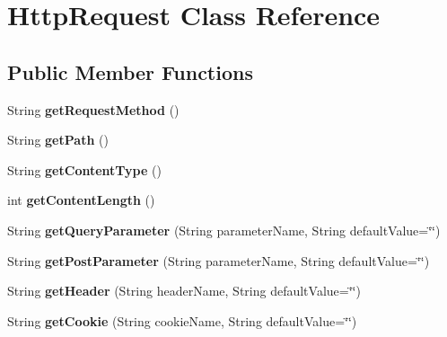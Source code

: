 \hypertarget{class_http_request}{}\section{Http\+Request Class Reference}
\label{class_http_request}
\subsection*{Public Member Functions}
\begin{DoxyCompactItemize}
\item 
\hypertarget{class_http_request_a286a1331701444b0c4ab04858a282c18}{}String {\bfseries get\+Request\+Method} ()\label{class_http_request_a286a1331701444b0c4ab04858a282c18}

\item 
\hypertarget{class_http_request_aac3961439d9ed0645b8acd753b8207ec}{}String {\bfseries get\+Path} ()\label{class_http_request_aac3961439d9ed0645b8acd753b8207ec}

\item 
\hypertarget{class_http_request_a72f9f4efa9ab95444ca5391dd144eec3}{}String {\bfseries get\+Content\+Type} ()\label{class_http_request_a72f9f4efa9ab95444ca5391dd144eec3}

\item 
\hypertarget{class_http_request_ad61cfcb6b2de741f0cf61473cf5ac1c4}{}int {\bfseries get\+Content\+Length} ()\label{class_http_request_ad61cfcb6b2de741f0cf61473cf5ac1c4}

\item 
\hypertarget{class_http_request_a200ace2d6dead0e314f80a55385b3378}{}String {\bfseries get\+Query\+Parameter} (String parameter\+Name, String default\+Value=\char`\"{}\char`\"{})\label{class_http_request_a200ace2d6dead0e314f80a55385b3378}

\item 
\hypertarget{class_http_request_a4d150360974338f51a8577ac0db4d8c0}{}String {\bfseries get\+Post\+Parameter} (String parameter\+Name, String default\+Value=\char`\"{}\char`\"{})\label{class_http_request_a4d150360974338f51a8577ac0db4d8c0}

\item 
\hypertarget{class_http_request_a9a47518aeb930576b337be2dc7926aab}{}String {\bfseries get\+Header} (String header\+Name, String default\+Value=\char`\"{}\char`\"{})\label{class_http_request_a9a47518aeb930576b337be2dc7926aab}

\item 
\hypertarget{class_http_request_aa138554e168a1fc98a43c0fb99403b26}{}String {\bfseries get\+Cookie} (String cookie\+Name, String default\+Value=\char`\"{}\char`\"{})\label{class_http_request_aa138554e168a1fc98a43c0fb99403b26}


\end{DoxyCompactItemize}
